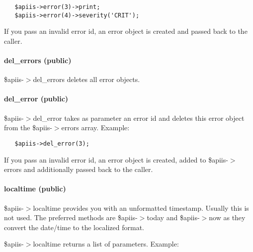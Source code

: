 \begin{verbatim}
   $apiis->error(3)->print;
   $apiis->error(4)->severity('CRIT');
\end{verbatim}


If you pass an invalid error id, an error object is created and passed back
to the caller.

\paragraph*{del\_errors (public)\label{Apiis::Init_--_Basic_initialisation_object_for_the_complete_APIIS_structure_del_errors_public_}}


\$apiis-$>$del\_errors deletes all error objects.

\paragraph*{del\_error (public)\label{Apiis::Init_--_Basic_initialisation_object_for_the_complete_APIIS_structure_del_error_public_}}


\$apiis-$>$del\_error takes as parameter an error id and deletes this error object
from the \$apiis-$>$errors array. Example:

\begin{verbatim}
   $apiis->del_error(3);
\end{verbatim}


If you pass an invalid error id, an error object is created, added to
\$apiis-$>$errors and additionally passed back to the caller.

\paragraph*{localtime (public)\label{Apiis::Init_--_Basic_initialisation_object_for_the_complete_APIIS_structure_localtime_public_}}


\$apiis-$>$localtime provides you with an unformatted timestamp. Usually this
is not used. The preferred methods are \$apiis-$>$today and \$apiis-$>$now as
they convert the date/time to the localized format.



\$apiis-$>$localtime returns a list of parameters. Example:

